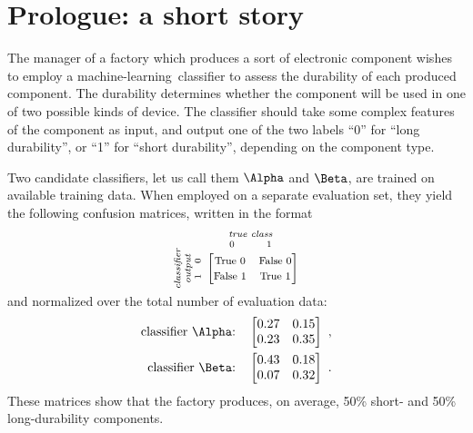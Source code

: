 \documentclass[\ifafour a4paper,12pt,\else a5paper,10pt,\fi%
onecolumn,oneside,article,%
british%
]{memoir}
\theoremstyle{remark}
\theoremstyle{innote}
\renewcommand*{\|}[1][]{\nonscript\:#1\vert\nonscript\:\mathopen{}}
\newcommand*{\ml}{machine-learning}
\begin{document}

\setcounter{section}{-1}

\section{Prologue: a short story}
\label{sec:intro}

The manager of a factory which produces a sort of electronic component wishes to employ a \ml\ classifier to assess the durability of each produced component. The durability determines whether the component will be used in one of two possible kinds of device. The classifier should take some complex features of the component as input, and output one of the two labels \enquote{0} for \enquote{long durability}, or \enquote{1} for \enquote{short durability}, depending on the component type.

Two candidate classifiers, let us call them $\Alpha$ and $\Beta$, are trained on available training data. When employed on a separate evaluation set, they yield the following confusion matrices, written in the format
\begin{equation*}
  \rotatebox[origin=c]{90}{
    \clap{\textit{\parbox{5em}{\centering\scriptsize classifier\\output\\$1\quad 0$}}
    }}\ 
    \overbracket[0pt]{
      \begin{bmatrix}
    \text{\footnotesize True 0} & \text{\footnotesize False 0}\\
    \text{\footnotesize False 1} & \text{\footnotesize True 1}\\
      \end{bmatrix}}^{
      \clap{\textit{\parbox{6em}{\centering\scriptsize true class\\$0\hspace{3em}1$}}
    }}
\end{equation*}
and normalized over the total number of evaluation data:
\begin{align}
  \label{eq:CM_A}
\text{classifier $\Alpha$:}\quad  \begin{bmatrix}
    0.27 & 0.15 \\ 0.23 & 0.35
  \end{bmatrix}
\ ,
  \\
  \label{eq:CM_B}
\text{classifier $\Beta$:}\quad  \begin{bmatrix}
    0.43 & 0.18 \\ 0.07 & 0.32
  \end{bmatrix}
\ .
\end{align}
These matrices show that the factory produces, on average, 50\% short- and 50\% long-durability components.
\end{document}
